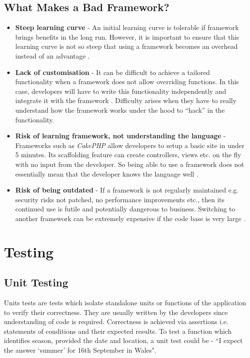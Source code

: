\subsection{What Makes a Bad Framework?}
\label{subsec:what-makes-a-bad-framework}
\begin{itemize}
 	  \item \textbf{Steep learning curve} - An initial learning curve is tolerable if framework brings benefits in the long run. However, it is important to ensure that this learning curve is not so steep that using a framework becomes an overhead instead of an advantage \cite{OSTraining}.

    \item \textbf{Lack of customisation } - It can be difficult to achieve a tailored functionality when a framework does not allow overriding functions. In this case, developers will have to write this functionality independently and integrate it with the framework \cite{Quora}. Difficulty arises when they have to really understand how the framework works under the hood to “hack” in the functionality.

    \item \textbf{Risk of learning framework, not understanding the language} - Frameworks such as \textit{CakePHP} allow developers to setup a basic site in under 5 minutes. Its scaffolding feature can create controllers, views etc. on the fly with no input from the developer. So being able to use a framework does not essentially mean that the developer knows the language well \cite{Vizteams}.

    \item \textbf{Risk of being outdated} - If a framework is not regularly maintained e.g. security risks not patched, no performance improvements etc., then its continued use is futile and potentially dangerous to business. Switching to another framework can be extremely expensive if the code base is very large \cite{Quora}.
\end{itemize}

\section{Testing}
\label{sec:testing}

\subsection{Unit Testing}
\label{subsec:unit-testing}

Units tests are tests which isolate standalone units or functions of the application to verify their correctness. They are usually written by the developers since understanding of code is required. Correctness is achieved via assertions i.e. statements of conditions and their expected results. To test a function which identifies season, provided the date and location, a unit test could be - “I expect the answer ‘summer’ for 16th September in Wales".

